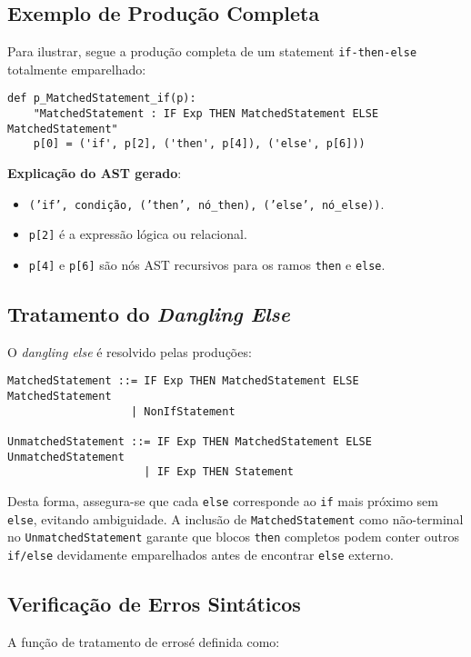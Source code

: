 \subsection{Exemplo de Produção Completa}

Para ilustrar, segue a produção completa de um statement \texttt{if-then-else} totalmente emparelhado:

\begin{verbatim}
def p_MatchedStatement_if(p):
    "MatchedStatement : IF Exp THEN MatchedStatement ELSE MatchedStatement"
    p[0] = ('if', p[2], ('then', p[4]), ('else', p[6]))
\end{verbatim}

\noindent

\textbf{Explicação do AST gerado}:
\begin{itemize}
    \item \texttt{('if', condição, ('then', nó\_then), ('else', nó\_else))}.
    \item \texttt{p[2]} é a expressão lógica ou relacional.
    \item \texttt{p[4]} e \texttt{p[6]} são nós AST recursivos para os ramos \texttt{then} e \texttt{else}.
\end{itemize}

\subsection{Tratamento do \emph{Dangling Else}}

O \emph{dangling else} é resolvido pelas produções:

\begin{verbatim}
MatchedStatement ::= IF Exp THEN MatchedStatement ELSE MatchedStatement
                   | NonIfStatement

UnmatchedStatement ::= IF Exp THEN MatchedStatement ELSE UnmatchedStatement
                     | IF Exp THEN Statement
\end{verbatim}

Desta forma, assegura-se que cada \texttt{else} corresponde ao \texttt{if} mais próximo sem \texttt{else}, evitando ambiguidade. A inclusão de \texttt{MatchedStatement} como não-terminal no \texttt{UnmatchedStatement} garante que blocos \texttt{then} completos podem conter outros \texttt{if/else} devidamente emparelhados antes de encontrar \texttt{else} externo.

\subsection{Verificação de Erros Sintáticos}
A função de tratamento de errosé definida como:

